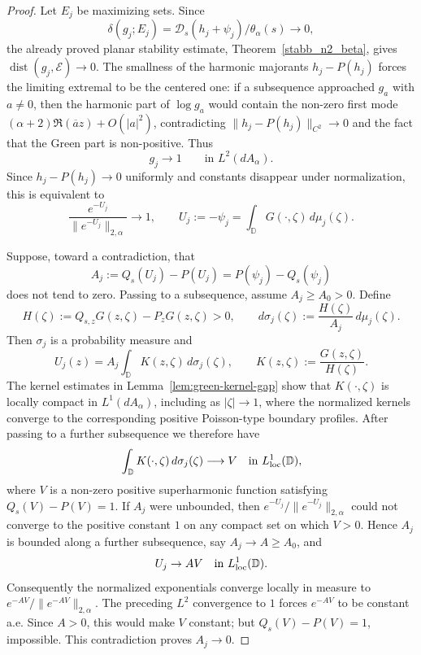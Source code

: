 \documentclass[a4paper,10pt]{amsart}
\newcommand{\D}{\mathbb{D}}
\begin{document}
\begin{proof}
Let $E_j$ be maximizing sets. Since
\[
\delta(g_j;E_j)=\mathcal D_s(h_j+\psi_j)/\theta_\alpha(s)\to0,
\]
the already proved planar stability estimate, Theorem~\ref{stabb_n2_beta},
gives $\operatorname{dist}(g_j,\mathcal E)\to0$. The smallness of the harmonic
majorants $h_j-P(h_j)$ forces the limiting extremal to be the centered one:
if a subsequence approached $g_a$ with $a\ne0$, then the harmonic part of
$\log g_a$ would contain the non-zero first mode
$(\alpha+2)\Re(\overline a z)+O(|a|^2)$, contradicting
$\|h_j-P(h_j)\|_{C^2}\to0$ and the fact that the Green part is non-positive.
Thus
\[
g_j\to1\qquad\text{in }L^2(dA_\alpha).
\]
Since $h_j-P(h_j)\to0$ uniformly and constants disappear under normalization,
this is equivalent to
\[
\frac{e^{-U_j}}{\|e^{-U_j}\|_{2,\alpha}}\to1,
\qquad
U_j:=-\psi_j=\int_\D G(\cdot,\zeta)\,d\mu_j(\zeta).
\]

Suppose, toward a contradiction, that
\[
A_j:=Q_s(U_j)-P(U_j)=P(\psi_j)-Q_s(\psi_j)
\]
does not tend to zero. Passing to a subsequence, assume $A_j\ge A_0>0$. Define
\[
H(\zeta):=Q_{s,z}G(z,\zeta)-P_zG(z,\zeta)>0,
\qquad
d\sigma_j(\zeta):=\frac{H(\zeta)}{A_j}\,d\mu_j(\zeta).
\]
Then $\sigma_j$ is a probability measure and
\[
U_j(z)=A_j\int_\D K(z,\zeta)\,d\sigma_j(\zeta),
\qquad
K(z,\zeta):=\frac{G(z,\zeta)}{H(\zeta)}.
\]
The kernel estimates in Lemma~\ref{lem:green-kernel-gap} show that
$K(\cdot,\zeta)$ is locally compact in $L^1(dA_\alpha)$, including as
$|\zeta|\to1$, where the normalized kernels converge to the corresponding
positive Poisson-type boundary profiles. After passing to a further subsequence
we therefore have
\[
\int_\D K(\cdot,\zeta)\,d\sigma_j(\zeta)\longrightarrow V
\quad\text{in }L^1_{\rm loc}(\D),
\]
where $V$ is a non-zero positive superharmonic function satisfying
$Q_s(V)-P(V)=1$. If $A_j$ were unbounded, then
$e^{-U_j}/\|e^{-U_j}\|_{2,\alpha}$ could not converge to the positive constant
$1$ on any compact set on which $V>0$. Hence $A_j$ is bounded along a further
subsequence, say $A_j\to A\ge A_0$, and
\[
U_j\to AV
\quad\text{in }L^1_{\rm loc}(\D).
\]
Consequently the normalized exponentials converge locally in measure to
$e^{-AV}/\|e^{-AV}\|_{2,\alpha}$. The preceding $L^2$ convergence to $1$ forces
$e^{-AV}$ to be constant a.e. Since $A>0$, this would make $V$ constant; but
$Q_s(V)-P(V)=1$, impossible. This contradiction proves $A_j\to0$.
\end{proof}
\end{document}
